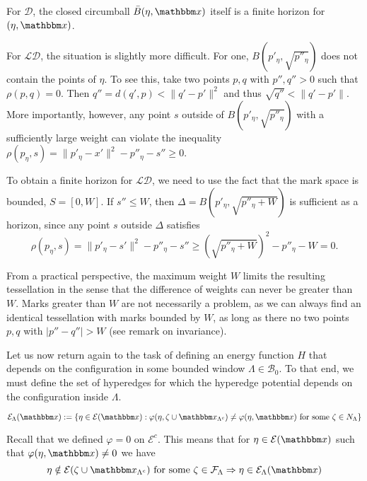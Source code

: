 \begin{remark} 
For $\mathcal D$, the closed circumball $\bar B(\eta,\x)$ itself is a finite horizon for $(\eta,\x)$.

For $\mathcal {LD}$, the situation is slightly more difficult. For one, $B(p'_\eta, \sqrt{p''_\eta})$ does not contain the points of $\eta$. To see this, take two points $p,q$ with $p'',q''>0$ such that $\rho(p,q)=0$. Then $q'' = d(q',p) < \|q'-p'\|^2$ and thus $\sqrt{q''} < \|q'-p'\|$. More importantly, however, any point $s$ outside of $B(p'_\eta, \sqrt{p''_\eta})$ with a sufficiently large weight can violate the inequality $\rho(p_\eta,s) = \|p'_\eta - x'\|^2 - p''_\eta - s'' \geq 0$. 

To obtain a finite horizon for $\mathcal {LD}$, we need to use the fact that the mark space is bounded, $S=[0,W]$. If $s'' \leq W$, then $\Delta = B(p'_\eta, \sqrt{p''_\eta + W})$ is sufficient as a horizon, since any point $s$ outside $\Delta$ satisfies
$$\rho(p_\eta, s) = \|p'_\eta - s'\|^2 - p''_\eta - s'' \geq (\sqrt{p''_\eta+W})^2-p''_\eta-W = 0.$$ 

From a practical perspective, the maximum weight $W$ limits the resulting tessellation in the sense that the difference of weights can never be greater than $W$. Marks greater than $W$ are not necessarily a problem, as we can always find an identical tessellation with marks bounded by $W$, as long as there no two points $p,q$ with $|p''-q''|>W$ (see remark on invariance).
\end{remark}

Let us now return again to the task of defining an energy function $H$ that depends on the configuration in some bounded window $\Lambda \in \mathcal B_0$. To that end, we must define the set of hyperedges for which the hyperedge potential depends on the configuration inside $\Lambda$. 

\begin{definition} 
$$\mathcal E_\Lambda(\x) := \{ \eta \in \mathcal E(\x): \varphi(\eta,\zeta \cup \x_{\Lambda^c}) \neq \varphi(\eta,\x) \text{ for some } \zeta \in N_\Lambda \}$$
\end{definition}

Recall that we defined $\varphi=0$ on $\mathcal E^c$. This means that for $\eta \in \mathcal E(\x)$ such that $\varphi(\eta,\x)\neq 0$ we have
$$\eta \notin \mathcal E(\zeta \cup \x_{\Lambda^c})\text{ for some }\zeta \in \mathcal F_{\Lambda} \Rightarrow \eta \in \mathcal E_{\Lambda}(\x)$$ 

